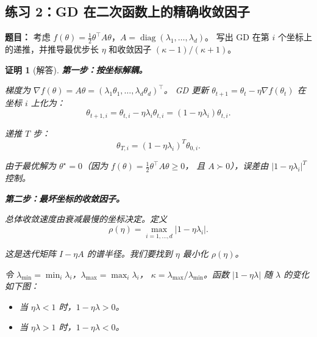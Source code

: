 \documentclass[12pt,a4paper]{ctexart}
\theoremstyle{definition}
\theoremstyle{plain}
\newtheorem*{proof*}{证明}
\newcommand{\diag}{\operatorname{diag}}
\newcommand{\grad}{\nabla}
\begin{document}
\subsection{练习 2：GD 在二次函数上的精确收敛因子}

\textbf{题目：} 考虑 $f(\theta) = \frac12\theta^\top A\theta$，$A = \diag(\lambda_1, \ldots, \lambda_d)$。
写出 GD 在第 $i$ 个坐标上的递推，并推导最优步长 $\eta$ 和收敛因子 $(\kappa - 1)/(\kappa + 1)$。

\begin{proof*}[解答]
\noindent\textbf{第一步：按坐标解耦。}

梯度为 $\grad f(\theta) = A\theta = (\lambda_1\theta_1, \dots, \lambda_d\theta_d)^\top$。
GD 更新 $\theta_{t+1} = \theta_t - \eta\grad f(\theta_t)$ 在坐标 $i$ 上化为：
\begin{equation}\label{s2:coord}
  \theta_{t+1,i} = \theta_{t,i} - \eta \lambda_i \theta_{t,i}
  = (1 - \eta\lambda_i) \theta_{t,i}.
\end{equation}

递推 $T$ 步：
\begin{equation}\label{s2:evol}
  \boxed{\theta_{T,i} = (1 - \eta\lambda_i)^T \theta_{0,i}.}
\end{equation}

由于最优解为 $\theta^\star = 0$（因为 $f(\theta) = \frac12\theta^\top A\theta \ge 0$，
且 $A \succ 0$），误差由 $|1 - \eta\lambda_i|^T$ 控制。

\medskip
\noindent\textbf{第二步：最坏坐标的收敛因子。}

总体收敛速度由衰减最慢的坐标决定。定义
\begin{equation}
  \rho(\eta) = \max_{i=1,\ldots,d} |1 - \eta \lambda_i|.
\end{equation}

这是迭代矩阵 $I - \eta A$ 的谱半径。我们要找到 $\eta$ 最小化 $\rho(\eta)$。

令 $\lambda_{\min} = \min_i \lambda_i$，$\lambda_{\max} = \max_i \lambda_i$，
$\kappa = \lambda_{\max} / \lambda_{\min}$。函数 $|1 - \eta\lambda|$ 随 $\lambda$ 的变化如下图：

\begin{center}
\begin{itemize}
  \item 当 $\eta \lambda < 1$ 时，$1 - \eta\lambda > 0$。
  \item 当 $\eta \lambda > 1$ 时，$1 - \eta\lambda < 0$。
\end{itemize}
\end{center}


\end{proof*}
\end{document}

